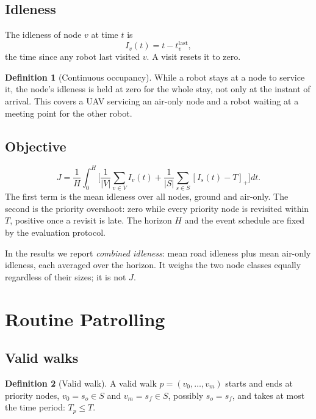 \documentclass[11pt]{article}
\newcommand{\pos}[1]{[#1]_+}
\theoremstyle{definition}
\newtheorem{definition}{Definition}
\theoremstyle{plain}
\begin{document}
\subsection{Idleness}
\label{sec:idle}

The idleness of node $v$ at time $t$ is
\begin{equation}
I_v(t) = t - t_v^{\mathrm{last}},
\end{equation}
the time since any robot last visited $v$. A visit resets it to zero.

\begin{definition}[Continuous occupancy]
While a robot stays at a node to service it, the node's idleness is held at
zero for the whole stay, not only at the instant of arrival. This covers a
UAV servicing an air-only node and a robot waiting at a meeting point for
the other robot.
\end{definition}

\subsection{Objective}

\begin{equation}
J = \frac{1}{H} \int_0^H \Bigg[ \frac{1}{|V|} \sum_{v \in V} I_v(t)
+ \frac{1}{|S|} \sum_{s \in S} \pos{I_s(t) - T} \Bigg] dt .
\label{eq:J}
\end{equation}
The first term is the mean idleness over all nodes, ground and air-only.
The second is the priority overshoot: zero while every priority node is
revisited within $T$, positive once a revisit is late. The horizon $H$ and
the event schedule are fixed by the evaluation protocol.

In the results we report \emph{combined idleness}: mean road idleness plus
mean air-only idleness, each averaged over the horizon. It weighs the two
node classes equally regardless of their sizes; it is not $J$.

\section{Routine Patrolling}

\subsection{Valid walks}

\begin{definition}[Valid walk]
A valid walk $p = (v_0, \ldots, v_m)$ starts and ends at priority nodes,
$v_0 = s_o \in S$ and $v_m = s_f \in S$, possibly $s_o = s_f$, and takes at
most the time period: $T_p \leq T$.
\end{definition}
\end{document}
